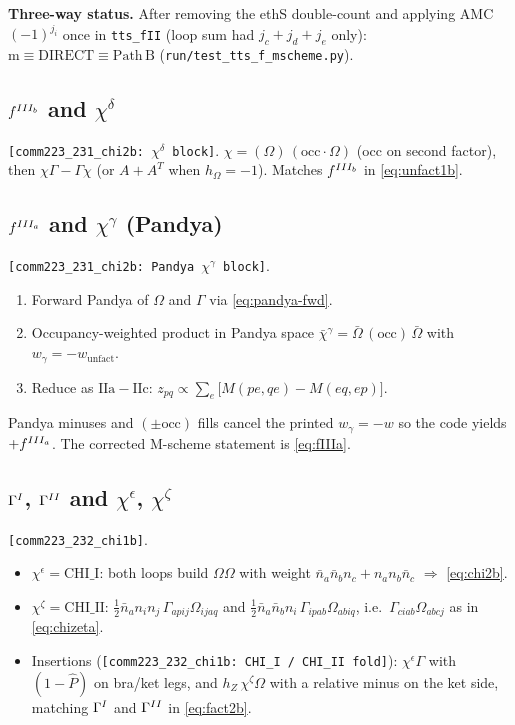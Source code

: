 \documentclass[enabledeprecatedfontcommands]{scrartcl}
\newcommand{\codename}[1]{\texttt{#1}}
\newcommand{\coderef}[1]{\textcolor{codeblue}{\texttt{[#1]}}}
\newcommand{\MyRomanNum}[1]{%
  \ifcase#1\or I\or II\or III\or IV\or V\or VI\or VII\or VIII\or IX\or X\else #1\fi}
\begin{document}
\textbf{Three-way status.}
After removing the ethS double-count and applying AMC $(-1)^{j_i}$ once in
\codename{tts\_fII} (loop sum had $j_c{+}j_d{+}j_e$ only):
$\mathrm{m}\equiv\mathrm{DIRECT}\equiv\mathrm{Path\,B}$
(\codename{run/test\_tts\_f\_mscheme.py}).

\subsection{$f^{\MyRomanNum{3}_b}$ and $\chi^\delta$}
\label{sec:code-fIIIb}

\coderef{comm223\_231\_chi2b: $\chi^\delta$ block}.
$\chi=(\Omega)\,(\mathrm{occ}\cdot\Omega)$ (occ on second factor), then
$\chi\Gamma-\Gamma\chi$ (or $A+A^{T}$ when $h_\Omega=-1$).
Matches $f^{\MyRomanNum{3}_b}$ in \eqref{eq:unfact1b}.

\subsection{$f^{\MyRomanNum{3}_a}$ and $\chi^\gamma$ (Pandya)}
\label{sec:code-fIIIa}

\coderef{comm223\_231\_chi2b: Pandya $\chi^\gamma$ block}.
\begin{enumerate}
  \item Forward Pandya of $\Omega$ and $\Gamma$ via \eqref{eq:pandya-fwd}.
  \item Occupancy-weighted product in Pandya space
    $\bar\chi^\gamma=\bar\Omega\,(\mathrm{occ})\,\bar\Omega$ with
    $w_\gamma=-w_{\mathrm{unfact}}$.
  \item Reduce as $\mathrm{IIa}-\mathrm{IIc}$:
    $z_{pq}\propto\sum_e\bigl[M(pe,qe)-M(eq,ep)\bigr]$.
\end{enumerate}
Pandya minuses and $(\pm\mathrm{occ})$ fills cancel the printed
$w_\gamma=-w$ so the code yields $+f^{\MyRomanNum{3}_a}$.
The corrected M-scheme statement is \eqref{eq:fIIIa}.

\subsection{$\Gamma^{\MyRomanNum{1}}$, $\Gamma^{\MyRomanNum{2}}$ and
$\chi^\epsilon$, $\chi^\zeta$}
\label{sec:code-GI-II}

\coderef{comm223\_232\_chi1b}.
\begin{itemize}
  \item $\chi^\epsilon=\mathrm{CHI\_I}$: both loops build
    $\Omega\Omega$ with weight
    $\bar n_a\bar n_b n_c+n_a n_b\bar n_c$
    $\Rightarrow$ \eqref{eq:chi2b}.
  \item $\chi^\zeta=\mathrm{CHI\_II}$:
    $\tfrac12\bar n_a n_i n_j\,\Gamma_{apij}\Omega_{ijaq}$ and
    $\tfrac12\bar n_a\bar n_b n_i\,\Gamma_{ipab}\Omega_{abiq}$,
    i.e.\ $\Gamma_{ciab}\Omega_{abcj}$ as in \eqref{eq:chizeta}.
  \item Insertions (\coderef{comm223\_232\_chi1b: CHI\_I / CHI\_II fold}):
    $\chi^\epsilon\Gamma$ with $(1-\hat P)$ on bra/ket legs, and
    $h_Z\,\chi^\zeta\Omega$ with a relative minus on the ket side,
    matching $\Gamma^{\MyRomanNum{1}}$ and $\Gamma^{\MyRomanNum{2}}$ in
    \eqref{eq:fact2b}.
\end{itemize}
\end{document}
